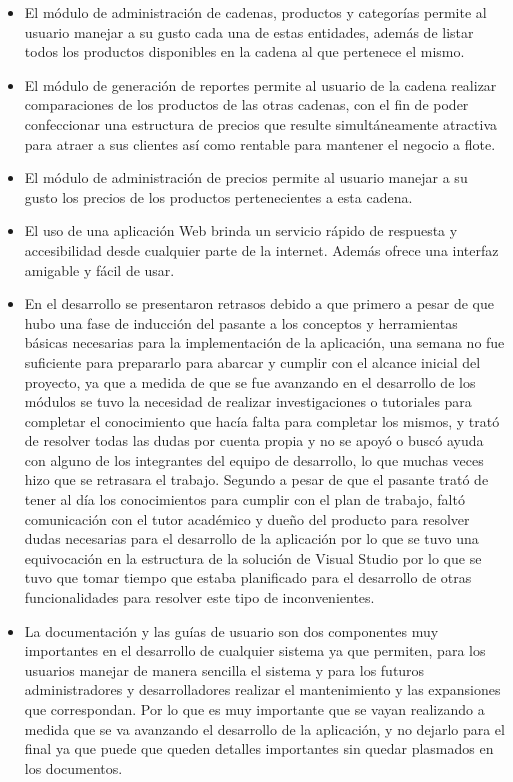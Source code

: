 \begin{itemize}
	\item El módulo de administración de cadenas, productos y categorías permite al usuario manejar a su gusto cada una de estas entidades, además de listar todos los productos disponibles en la cadena al que pertenece el mismo.
	\item El módulo de generación de reportes permite al usuario de la cadena realizar comparaciones de los productos de las otras cadenas, con el fin de poder confeccionar una estructura de precios que resulte simultáneamente atractiva para atraer a sus clientes así como rentable para mantener el negocio a flote. 
	\item El módulo de administración de precios permite al usuario manejar a su gusto los precios de los productos pertenecientes a esta cadena.
	\item El uso de una aplicación Web brinda un servicio rápido de respuesta y accesibilidad desde cualquier parte de la internet. Además ofrece una interfaz amigable y fácil de usar.
	\item En el desarrollo se presentaron retrasos debido a que primero a pesar de que hubo una fase de inducción del pasante a los conceptos y herramientas básicas necesarias para la implementación de la aplicación, una semana no fue suficiente para prepararlo para abarcar y cumplir con el alcance inicial del proyecto, ya que a medida de que se fue avanzando en el desarrollo de los módulos se tuvo la necesidad de realizar investigaciones o tutoriales para completar el conocimiento que hacía falta para completar los mismos, y trató de resolver todas las dudas por cuenta propia y no se apoyó o buscó ayuda con alguno de los integrantes del equipo de desarrollo, lo que muchas veces hizo que se retrasara el trabajo. Segundo a pesar de que el pasante trató de tener al día los conocimientos para cumplir con el plan de trabajo, faltó comunicación con el tutor académico y dueño del producto para resolver dudas necesarias para el desarrollo de la aplicación por lo que se tuvo una equivocación en la estructura de la solución de Visual Studio por lo que se tuvo que tomar tiempo que estaba planificado para el desarrollo de otras funcionalidades para resolver este tipo de inconvenientes.
	\item La documentación y las guías de usuario son dos componentes muy importantes en el desarrollo de cualquier sistema ya que permiten, para los usuarios manejar de manera sencilla el sistema y para los futuros administradores y desarrolladores realizar el mantenimiento y las expansiones que correspondan. Por lo que es muy importante que se vayan realizando a medida que se va avanzando el desarrollo de la aplicación, y no dejarlo para el final ya que puede que queden detalles importantes sin quedar plasmados en los documentos.

\end{itemize}
